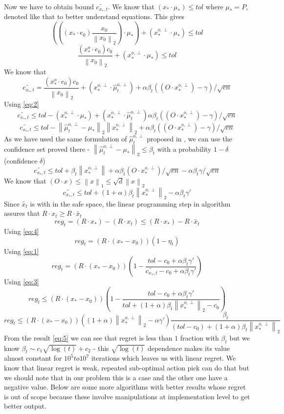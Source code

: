 \documentclass[BTech,thesis]{iitmdiss}
\newcommand{\norm}[1]{\left\lVert#1\right\rVert}
\begin{document}
Now we have to obtain bound $\widetilde{c_{x_*,t}}$. We know that $(x_*\cdot \mu_*) \leq tol$ where $\mu_* = P$, denoted like that to better understand equations. This gives
$$ (((x_{*}\cdot e_0)\frac{x_0}{\norm{x_0}_2})\cdot \mu_*) + (x_{*}^{o,\perp}\cdot \mu_*) \leq tol $$
\begin{equation}
    \frac{(x_*^o\cdot e_0)c_0}{\norm{x_0}_2} + (x_{*}^{o,\perp}\cdot \mu_*) \leq tol \label{eq:2}
\end{equation}
We know that 
$$ \widetilde{c_{x_*,t}} = \frac{(x_*^o\cdot e_0)c_0}{\norm{x_0}_2} + (x^{o,\perp}_*\cdot \widehat{\mu}^{o,\perp}_t)  + \alpha\beta_t ( (O\cdot x^{o,\perp}_*) - \gamma)/\sqrt{en} $$
Using \eqref{eq:2}
$$ \widetilde{c_{x_*,t}} \leq tol - (x_{*}^{o,\perp}\cdot \mu_*) + (x^{o,\perp}_*\cdot \widehat{\mu}^{o,\perp}_t) \alpha\beta_t ( (O\cdot x^{o,\perp}_*) - \gamma)/\sqrt{en} $$
$$ \widetilde{c_{x_*,t}} \leq tol - \norm{\widehat{\mu}^{o,\perp}_t - \mu_*}_2 \norm{x_{*}^{o,\perp}}_2 + \alpha\beta_t ( (O\cdot x^{o,\perp}_*) - \gamma)/\sqrt{en} $$
As we have used the same formulation of $\widehat{\mu}^{o,\perp}_t$ proposed in \cite{pan:pr:slb}, we can use the confidence set proved there - $\norm{\widehat{\mu}^{o,\perp}_t - \mu_*}_2 \leq \beta_t$ with a probability $1-\delta$ (confidence $\delta$) 
$$ \widetilde{c_{x_*,t}} \leq tol + \beta_t\norm{x_{*}^{o,\perp}} + \alpha\beta_t(O\cdot x^{o,\perp}_*)/\sqrt{en} - \alpha\beta_t\gamma/\sqrt{en}$$
We know that $ (O\cdot x) \leq \norm{x}_1 \leq \sqrt{d}\norm{x}_2 $
\begin{equation}
    \widetilde{c_{x_*,t}} \leq tol + (1+\alpha)\beta_t\norm{x_{*}^{o,\perp}}_2 - \alpha\beta_t\gamma' \label{eq:3}
\end{equation}
Since $\widetilde{x_t}$ is with in the safe space, the linear programming step in algorithm assures that $R\cdot x_t  \geq R\cdot \widetilde{x_t}$
$$ reg_t = (R\cdot x_*) - (R\cdot x_t) \leq (R\cdot x_*) - R\cdot \widetilde{x_t} $$
Using \eqref{eq:4}
$$ reg_t = (R \cdot (x_* - x_0))(1-\eta_t) $$
Using \eqref{eq:1}
$$ reg_t = (R \cdot (x_* - x_0))(1-\frac{tol-c_0+\alpha\beta_t\gamma'}{\widetilde{c_{x_*,t}} - c_0+\alpha\beta_t\gamma'}) $$
Using \eqref{eq:3}
$$ reg_t \leq (R \cdot (x_* - x_0)) (1 - \frac{tol-c_0+\alpha\beta_t\gamma'}{tol + (1+\alpha)\beta_t\norm{x_{*}^{o,\perp}}_2 - c_0}) $$
\begin{equation}
    reg_t \leq (R \cdot (x_* - x_0))((1+\alpha)\norm{x_{*}^{o,\perp}}_2 - \alpha\gamma')\frac{\beta_t}{(tol  - c_0) + (1+\alpha)\beta_t\norm{x_{*}^{o,\perp}}_2} \label{eq:5}
\end{equation}
From the result \eqref{eq:5} we can see that regret is less than $1$ fraction with $\beta_t$ but we know $\beta_t \sim c_1\sqrt{\log(t)} + c_2$ - this $\sqrt{\log(t)}$ dependence makes its value almost constant for $10^5 to 10^7$ iterations which leaves us with linear regret. We know that linear regret is weak, repeated sub-optimal action pick can do that but we should note that in our problem this is a case and the other one have a negative value. Below are some more algorithms with better results whose regret is out of scope because these involve manipulations at implementation level to get better output.
\end{document}
